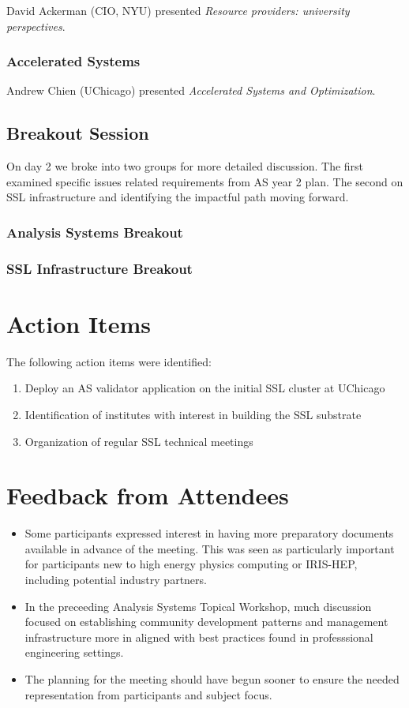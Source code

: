 \documentclass[11pt,letterpaper,fleqn]{article}
\begin{document}
David Ackerman (CIO, NYU) presented {\it Resource providers: university perspectives}. 


\subsubsection{Accelerated Systems}

Andrew Chien (UChicago) presented {\it Accelerated Systems and Optimization}. 



\subsection{Breakout Session}
On day 2 we broke into two groups for more detailed discussion.  The first examined specific issues related requirements from AS year 2 plan.  The second on SSL infrastructure and identifying the impactful path moving forward.

\subsubsection{Analysis Systems Breakout}


\subsubsection{SSL Infrastructure Breakout}




\section{Action Items}
The following action items were identified:
\begin{enumerate}
  \item Deploy an AS validator application on the initial SSL cluster at UChicago
  \item Identification of institutes with interest in building the SSL substrate
  \item Organization of regular SSL technical meetings
\end{enumerate}

\section{Feedback from Attendees}
\begin{itemize}
  \item Some participants expressed interest in having more preparatory documents available in advance of the meeting.  This was seen as particularly important for participants new to high energy physics computing or IRIS-HEP, including potential industry partners.
  \item In the preceeding Analysis Systems Topical Workshop, much discussion focused on establishing community development patterns and management infrastructure more in aligned with best practices found in professsional engineering settings. 
  \item The planning for the meeting should have begun sooner to ensure the needed representation from participants and subject focus.
\end{itemize}
\end{document}
